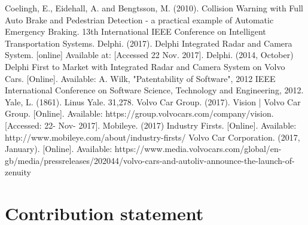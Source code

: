 \documentclass[conference]{IEEEtran}
\begin{document}
\begin{thebibliography}{00}
	 Coelingh, E., Eidehall, A. and Bengtsson, M. (2010). Collision Warning with Full Auto Brake and Pedestrian Detection - a practical example of Automatic Emergency Braking. 13th International IEEE Conference on Intelligent Transportation Systems.
	 Delphi. (2017). Delphi Integrated Radar and Camera System. [online] Available at:  [Accessed 22 Nov. 2017].
	 Delphi. (2014, October) Delphi First to Market with Integrated Radar and Camera System on Volvo Cars. [Online]. Available: 
	 A. Wilk, "Patentability of Software", 2012 IEEE International Conference on Software Science, Technology and Engineering, 2012.
	 Yale, L. (1861). Linus Yale. 31,278.
	 Volvo Car Group. (2017). Vision | Volvo Car Group. [Online]. Available: https://group.volvocars.com/company/vision. [Accessed: 22- Nov- 2017].
	  Mobileye. (2017) Industry Firsts. [Online]. Available: http://www.mobileye.com/about/industry-firsts/
	 Volvo Car Corporation. (2017, January). [Online]. Available: https://www.media.volvocars.com/global/en-gb/media/pressreleases/202044/volvo-cars-and-autoliv-announce-the-launch-of-zenuity
	
\end{thebibliography}

\pagebreak
\appendix
\section*{Contribution statement}
\end{document}
